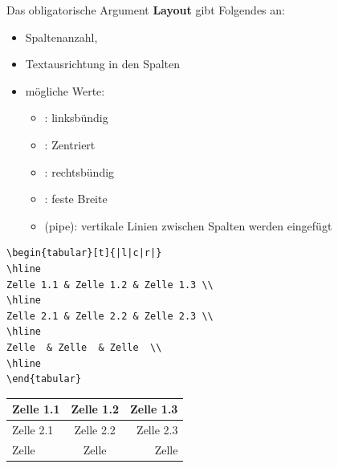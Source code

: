 \begin{frame}[fragile]
Das obligatorische Argument \textbf{Layout} gibt Folgendes an:

\begin{itemize}
	\item Spaltenanzahl,
	
	\item Textausrichtung in den Spalten

	\item mögliche Werte:
	
	\begin{itemize}
		\item {}: linksbündig
		\item {}: Zentriert
		\item {}: rechtsbündig
		\item {}: feste Breite
		\item \ltxterm{|} (pipe): vertikale Linien zwischen Spalten werden eingefügt
	\end{itemize}
	
\end{itemize}

\pause 

\begin{multicols}{2}
	
{\scriptsize
\begin{lstlisting}
\begin{tabular}[t]{|l|c|r|}
\hline
Zelle 1.1 & Zelle 1.2 & Zelle 1.3 \\
\hline
Zelle 2.1 & Zelle 2.2 & Zelle 2.3 \\
\hline
Zelle  & Zelle  & Zelle  \\
\hline
\end{tabular}
\end{lstlisting}
}
	
	\columnbreak
	
	\begin{tabular}[t]{|l|c|r|}
		\hline
		Zelle 1.1 & Zelle 1.2 & Zelle 1.3 \\
		\hline
		Zelle 2.1 & Zelle 2.2 & Zelle 2.3 \\
		\hline
		Zelle  & Zelle  & Zelle  \\
		\hline
	\end{tabular}
\end{multicols}

\end{frame}


